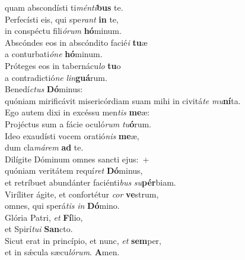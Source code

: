 \oddverse quam abscondísti ti\textit{mén}\textit{ti}\textbf{bus} te.\\
\evenverse Perfecísti eis, qui spe\textit{rant} \textbf{in} te,~\*\\
\evenverse in conspéctu fili\textit{ó}\textit{rum} \textbf{hó}minum.\\
\oddverse Abscóndes eos in abscóndito facié\textit{i} \textbf{tu}æ~\*\\
\oddverse a conturbati\textit{ó}\textit{ne} \textbf{hó}minum.\\
\evenverse Próteges eos in tabernácu\textit{lo} \textbf{tu}o~\*\\
\evenverse a contradictió\textit{ne} \textit{lin}\textbf{guá}rum.\\
\oddverse Benedí\textit{ctus} \textbf{Dó}minus:~\*\\
\oddverse quóniam mirificávit misericórdiam suam mihi in civitá\textit{te} \textit{mu}\textbf{ní}ta.\\
\evenverse Ego autem dixi in excéssu men\textit{tis} \textbf{me}æ:~\*\\
\evenverse Projéctus sum a fácie oculó\textit{rum} \textit{tu}\textbf{ó}rum.\\
\oddverse Ideo exaudísti vocem oratió\textit{nis} \textbf{me}æ,~\*\\
\oddverse dum cla\textit{má}\textit{rem} \textbf{ad} te.\\
\evenverse Dilígite Dóminum omnes sancti ejus:~+\\
\evenverse  quóniam veritátem requí\textit{ret} \textbf{Dó}minus,~\*\\
\evenverse et retríbuet abundánter faciénti\textit{bus} \textit{su}\textbf{pér}biam.\\
\oddverse Viríliter ágite, et confortétur \textit{cor} \textbf{ve}strum,~\*\\
\oddverse omnes, qui sperá\textit{tis} \textit{in} \textbf{Dó}mino.\\
\evenverse Glória Patri, \textit{et} \textbf{Fí}lio,~\*\\
\evenverse et Spirí\textit{tu}\textit{i} \textbf{San}cto.\\
\oddverse Sicut erat in princípio, et nunc, \textit{et} \textbf{sem}per,~\*\\
\oddverse et in sǽcula sæcu\textit{ló}\textit{rum}. \textbf{A}men.\\
